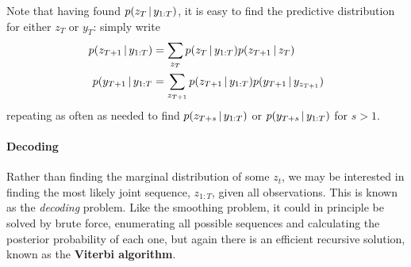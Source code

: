Note that having found $p(z_T \, \vert \, y_{1:T})$, it is easy to find the
predictive distribution for either $z_T$ or $y_{T}$: simply write
\begin{align}
  p(z_{T+1} \, \vert \, y_{1:T}) &= \sum_{z_T} p(z_T \, \vert \, y_{1:T})
                              p(z_{T+1} \, \vert \, z_{T}) \\
  p(y_{T+1} \, \vert \, y_{1:T} &= \sum_{z_{T+1}} p(z_{T+1} \, \vert \, y_{1:T})
                             p(y_{T+1} \, \vert \, y_{z_{T+1}})
\end{align}
repeating as often as needed to find $p(z_{T+s} \, \vert \, y_{1:T})$ or
$p(y_{T+s} \, \vert \, y_{1:T})$ for $s > 1$.

\paragraph{Decoding}

Rather than finding the marginal distribution of some $z_t$, we may be
interested in finding the most likely joint sequence, $z_{1:T}$, given
all observations.  This is known as the {\em decoding} problem.  Like
the smoothing problem, it could in principle be solved by brute force,
enumerating all possible sequences and calculating the posterior
probability of each one, but again there is an efficient recursive
solution, known as the {\bf Viterbi algorithm}.

